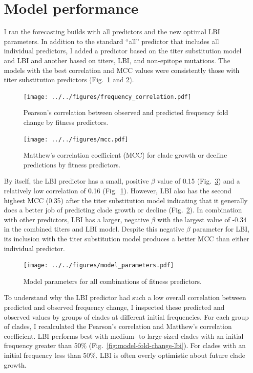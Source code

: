 \documentclass[12pt]{article}
\begin{document}
\section{Model performance}

I ran the forecasting builds with all predictors and the new optimal LBI parameters.
In addition to the standard ``all'' predictor that includes all individual predictors, I added a predictor based on the titer substitution model and LBI and another based on titers, LBI, and non-epitope mutations.
The models with the best correlation and MCC values were consistently those with titer substitution predictors (Fig.~\ref{fig:model-frequency-correlations} and \ref{fig:model-mcc}).

\begin{figure}
\texttt{[image: ../../figures/frequency\_correlation.pdf]}
\caption{\label{fig:model-frequency-correlations}Pearson's correlation between observed and predicted frequency fold change by fitness predictors.}
\end{figure}

\begin{figure}
\texttt{[image: ../../figures/mcc.pdf]}
\caption{\label{fig:model-mcc}Matthew's correlation coefficient (MCC) for clade growth or decline predictions by fitness predictors.}
\end{figure}

By itself, the LBI predictor has a small, positive $\beta$ value of 0.15 (Fig.~\ref{fig:model-parameters}) and a relatively low correlation of 0.16 (Fig.~\ref{fig:model-frequency-correlations}).
However, LBI also has the second highest MCC (0.35) after the titer substitution model indicating that it generally does a better job of predicting clade growth or decline (Fig.~\ref{fig:model-mcc}).
In combination with other predictors, LBI has a larger, negative $\beta$ with the largest value of -0.34 in the combined titers and LBI model.
Despite this negative $\beta$ parameter for LBI, its inclusion with the titer substitution model produces a better MCC than either individual predictor.

\begin{figure}
\texttt{[image: ../../figures/model\_parameters.pdf]}
\caption{\label{fig:model-parameters}Model parameters for all combinations of fitness predictors.}
\end{figure}

To understand why the LBI predictor had such a low overall correlation between predicted and observed frequency change, I inspected these predicted and observed values by groups of clades at different initial frequencies.
For each group of clades, I recalculated the Pearson's correlation and Matthew's correlation coefficient.
LBI performs best with medium- to large-sized clades with an initial frequency greater than 50\% (Fig.~\ref{fig:model-fold-change-lbi}).
For clades with an initial frequency less than 50\%, LBI is often overly optimistic about future clade growth.
\end{document}
